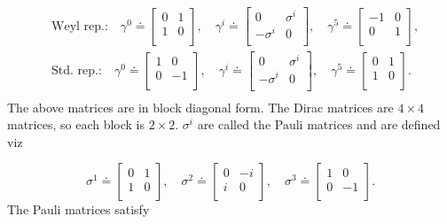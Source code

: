 \begin{equation}
	\begin{split}
		&\text{Weyl rep.:} \quad \gamma^0\doteq \begin{bmatrix}
			0 & 1 \\
			1 & 0 \\
		\end{bmatrix}, \quad \gamma^i\doteq\begin{bmatrix}
			0 & \sigma^i \\
			-\sigma^i & 0 \\
		\end{bmatrix}, \quad \gamma^5\doteq\begin{bmatrix}
			-1 & 0 \\
			0 & 1 \\
		\end{bmatrix},\\
		&\text{Std. rep.:} \quad \gamma^0\doteq \begin{bmatrix}
			1 & 0 \\
			0 & -1 \\
		\end{bmatrix}, \quad \gamma^i\doteq\begin{bmatrix}
			0 & \sigma^i \\
			-\sigma^i & 0 \\
		\end{bmatrix}, \quad \gamma^5\doteq\begin{bmatrix}
			0 & 1 \\
			1 & 0 \\
		\end{bmatrix}.\\
	\end{split}
\end{equation} 
The above matrices are in block diagonal form. The Dirac matrices are $4\times 4$ matrices, so each block is $2\times 2$. $\sigma^i$ are called the Pauli matrices and are defined viz

\begin{equation}
	\sigma^1\doteq \begin{bmatrix}
		0 & 1\\
		1 & 0 \\
	\end{bmatrix}, \quad \sigma^2\doteq \begin{bmatrix}
		0 & -i\\
		i & 0 \\
	\end{bmatrix}, \quad \sigma^3\doteq \begin{bmatrix}
		1 & 0\\
		0 & -1 \\
	\end{bmatrix}.
\end{equation} 
The Pauli matrices satisfy

